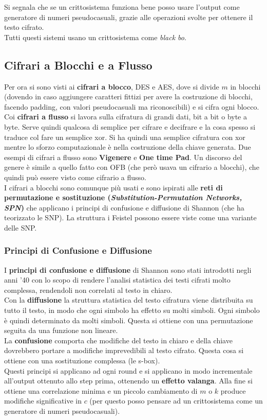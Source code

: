 \documentclass[a4paper,12pt, oneside]{book}
\begin{document}
Si segnala che se un crittosistema funziona bene posso usare l'output come
generatore di numeri pseudocasuali, grazie alle operazioni svolte per ottenere
il testo cifrato.\\
Tutti questi sistemi usano un crittosistema come \textit{black bo}.\\
\subsection{Cifrari a Blocchi e a Flusso}
Per ora si sono visti ai \textbf{cifrari a blocco}, DES e AES, dove si divide
$m$ in blocchi (dovendo in caso aggiungere caratteri fittizi per avere la
costruzione di blocchi, facendo padding,
con valori pseudocasuali ma riconoscibili) e si cifra ogni blocco.\\
Coi \textbf{cifrari a flusso} si lavora sulla cifratura di grandi dati, bit a
bit o byte a byte. Serve quindi qualcosa di semplice per cifrare e decifrare e
la cosa spesso si traduce col fare un semplice xor. Si ha quindi una semplice
cifratura con xor mentre lo sforzo computazionale è nella costruzione della
chiave generata. Due esempi di cifrari a flusso sono \textbf{Vigenere} e
\textbf{One time Pad}. Un discorso del genere è simile a quello fatto con OFB
(che però usava un cifrario a blocchi), che quindi può essere visto come
cifrario a flusso.\\
I cifrari a blocchi sono comunque più usati e sono ispirati alle \textbf{reti di
permutazione e sostituzione (\textit{Substitution-Permutation Networks, SPN})}
che applicano i principi di confusione e diffusione di Shannon (che ha
teorizzato le SNP). La struttura i Feistel possono essere viste come una
variante delle SNP.
\subsubsection{Principi di Confusione e Diffusione}
I \textbf{principi di confusione e diffusione} di Shannon sono stati introdotti
negli anni '40 con lo scopo di rendere l'analisi statistica dei testi cifrati
molto complessa, rendendoli non correlati al testo in chiaro. \\
Con la \textbf{diffusione} la struttura statistica del testo cifratura viene
distribuita 
su tutto il testo, in modo che ogni simbolo ha effetto su molti simboli. Ogni
simbolo è quindi determinato da molti simboli. Questa si ottiene con una
permutazione seguita da una funzione non lineare.\\
La \textbf{confusione} comporta che modifiche del testo in chiaro e della chiave
dovrebbero portare a modifiche imprevedibili al testo cifrato. Questa cosa si
ottiene con una sostituzione complessa (le s-box). \\
Questi principi si applicano ad ogni round e si applicano in modo incrementale
all'output ottenuto allo step prima, ottenendo un \textbf{effetto valanga}. Alla
fine si ottiene una correlazione minima e un piccolo cambiamento di $m$ o $k$
produce modifiche significative in $c$ (per questo posso pensare ad un
crittosistema come un generatore di numeri pseudocasuali). \\
\end{document}
